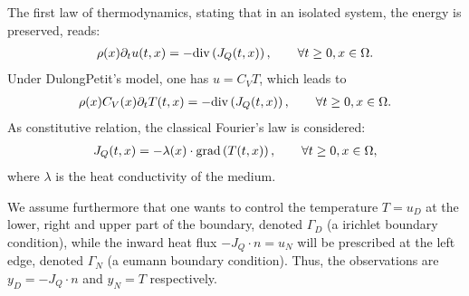 \documentclass[letterpaper,10pt,english]{sphinxmanual}
\begin{document}
\sphinxAtStartPar
The first law of thermodynamics, stating that in an isolated system, the
energy is preserved, reads:
\begin{equation*}
\begin{split}\rho(x) \partial_t u(t, x) = - {\rm div} \left( J_Q(t, x) \right), \qquad \forall t \ge 0, x \in \Omega.\end{split}
\end{equation*}
\sphinxAtStartPar
Under Dulong\sphinxhyphen{}Petit’s model, one has \(u = C_V T\), which leads to
\begin{equation*}
\begin{split}\rho(x) C_V(x) \partial_t T(t, x) = - {\rm div} \left( J_Q(t, x) \right), \qquad \forall t \ge 0, x \in \Omega.\end{split}
\end{equation*}
\sphinxAtStartPar
As constitutive relation, the classical Fourier’s law is considered:
\begin{equation*}
\begin{split}J_Q(t, x) = - \lambda(x) \cdot {\rm grad} \left( T(t, x) \right), \qquad \forall t \ge 0, x \in \Omega,\end{split}
\end{equation*}
\sphinxAtStartPar
where \(\lambda\) is the  heat conductivity of the
medium.

\sphinxAtStartPar
We assume furthermore that one wants to control the temperature
\(T = u_D\) at the lower, right and upper part of the boundary,
denoted \(\Gamma_D\) (a irichlet boundary condition), while
the inward heat flux \(-J_Q \cdot n = u_N\) will be prescribed at
the left edge, denoted \(\Gamma_N\) (a eumann boundary
condition). Thus, the observations are \(y_D = - J_Q \cdot n\) and
\(y_N = T\) respectively.
\end{document}
